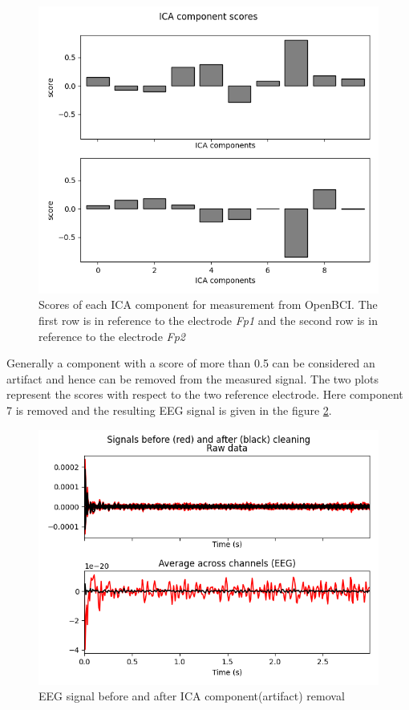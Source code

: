 \begin{figure}[h] 
    \begin{center}
    \includegraphics[height=0.6\textwidth]{images/obci_ica_scores.png}
    \caption{Scores of each ICA component for measurement from OpenBCI. The first row is in reference to the electrode \textit{Fp1} and the second row is in reference to the electrode \textit{Fp2}}
    \label{fig:obci_ica_scores}
\end{center}
\end{figure}

Generally a component with a score of more than 0.5 can be considered an artifact and hence can be removed from the measured signal. The two plots represent the scores with respect to the two reference electrode. Here component 7 is removed and the resulting EEG signal is given in the figure \ref{fig:obci_ica_overay}.

\begin{figure}[h] 
    \begin{center}
    \includegraphics[height=0.6\textwidth]{images/obci_ica_overay.png}
    \caption{EEG signal before and after ICA component(artifact) removal}
    \label{fig:obci_ica_overay}
\end{center}
\end{figure}

